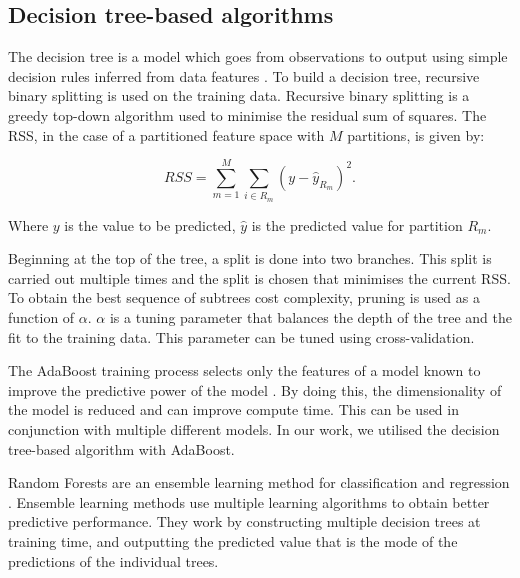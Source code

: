 %



\subsection{Decision tree-based algorithms}

The decision tree is a model which goes from observations to output using simple decision rules inferred from data features \cite{Quinlan}. To build a decision tree, recursive binary splitting is used on the training data. Recursive binary splitting is a greedy top-down algorithm used to minimise the residual sum of squares. The RSS, in the case of a partitioned feature space with $M$ partitions, is given by:

\begin{equation}
RSS=\sum^M_{m=1}\sum_{i\in R_m}(y-\hat{y}_{R_m})^2.
\end{equation}

\noindent Where $y$ is the value to be predicted, $\hat{y}$ is the predicted value for partition $R_m$.



Beginning at the top of the tree, a split is done into two branches. This split is carried out multiple times and the split is chosen that minimises the current RSS. To obtain the best sequence of subtrees cost complexity, pruning is used as a function of $\alpha$. $\alpha$ is a tuning parameter that balances the depth of the tree and the fit to the training data. This parameter can be tuned using cross-validation.


The AdaBoost training process selects only the features of a model known to improve the predictive power of the model \cite{Freund1997}. By doing this, the dimensionality of the model is reduced and can improve compute time. This can be used in conjunction with multiple different models. In our work, we utilised the decision tree-based algorithm with AdaBoost.


Random Forests are an ensemble learning method for classification and regression \cite{Breiman2001}. Ensemble learning methods use multiple learning algorithms to obtain better predictive performance. They work by constructing multiple decision trees at training time, and outputting the predicted value that is the mode of the predictions of the individual trees.

